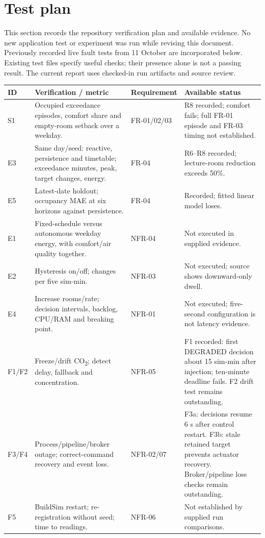 \documentclass[11pt,a4paper]{article}
\begin{document}
\section{Test plan}
This section records the repository verification plan and available evidence. No new application test or experiment was run while revising this document. Previously recorded live fault tests from 11 October are incorporated below. Existing test files specify useful checks; their presence alone is not a passing result. The current report uses checked-in run artifacts and source review.
{\small\begin{longtable}{p{19mm}p{63mm}p{24mm}p{37mm}}\toprule ID & Verification / metric & Requirement & Available status\\\midrule\endhead
S1 & Occupied exceedance episodes, comfort share and empty-room setback over a weekday. & FR-01/02/03 & R8 recorded; comfort fails; full FR-01 episode and FR-03 timing not established.\\
E3 & Same day/seed: reactive, persistence and timetable; exceedance minutes, peak, target changes, energy. & FR-04 & R6--R8 recorded; lecture-room reduction exceeds 50\%.\\
E5 & Latest-date holdout; occupancy MAE at six horizons against persistence. & FR-04 & Recorded; fitted linear model loses.\\
E1 & Fixed-schedule versus autonomous weekday energy, with comfort/air quality together. & NFR-04 & Not executed in supplied evidence.\\
E2 & Hysteresis on/off; changes per five sim-min. & NFR-03 & Not executed; source shows downward-only dwell.\\
E4 & Increase rooms/rate; decision intervals, backlog, CPU/RAM and breaking point. & NFR-01 & Not executed; five-second configuration is not latency evidence.\\
F1/F2 & Freeze/drift CO\textsubscript{2}; detect delay, fallback and concentration. & NFR-05 & F1 recorded: first DEGRADED decision about 15 sim-min after injection; ten-minute deadline fails. F2 drift test remains outstanding.\\
F3/F4 & Process/pipeline/broker outage; correct-command recovery and event loss. & NFR-02/07 & F3a: decisions resume 6 s after control restart. F3b: stale retained target prevents actuator recovery. Broker/pipeline loss checks remain outstanding.\\
F5 & BuildSim restart; re-registration without seed; time to readings. & NFR-06 & Not established by supplied run comparisons.\\

\end{longtable}}
\end{document}
